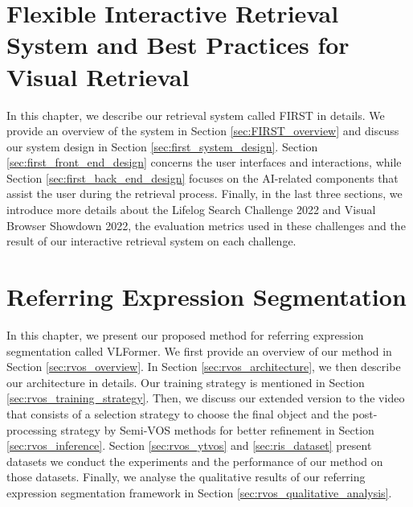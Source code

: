 \chapter{Flexible Interactive Retrieval System and Best Practices for Visual Retrieval}
\label{chap-first}
\begin{ChapAbstract}
In this chapter, we describe our retrieval system called FIRST in details. We provide an overview of the system in Section \ref{sec:FIRST_overview} and discuss our system design in Section \ref{sec:first_system_design}. Section \ref{sec:first_front_end_design} concerns the user interfaces and interactions, while Section \ref{sec:first_back_end_design} focuses on the AI-related components that assist the user during the retrieval process. Finally, in the last three sections, we introduce more details about the Lifelog Search Challenge 2022 and Visual Browser Showdown 2022, the evaluation metrics used in these challenges and the result of our interactive retrieval system on each challenge.
\end{ChapAbstract}


\chapter{Referring Expression Segmentation}
\label{chap-refer-seg}
\begin{ChapAbstract}
In this chapter, we present our proposed method for referring expression segmentation called VLFormer. We first provide an overview of our method in Section \ref{sec:rvos_overview}. In Section \ref{sec:rvos_architecture}, we then describe our architecture in details. Our training strategy is mentioned in Section \ref{sec:rvos_training_strategy}. Then, we discuss our extended version to the video that consists of a selection strategy to choose the final object and the post-processing strategy by Semi-VOS methods for better refinement in Section \ref{sec:rvos_inference}. Section \ref{sec:rvos_ytvos} and \ref{sec:ris_dataset} present datasets we conduct the experiments and the performance of our method on those datasets. Finally, we analyse the qualitative results of our referring expression segmentation framework in Section \ref{sec:rvos_qualitative_analysis}.


\end{ChapAbstract}







